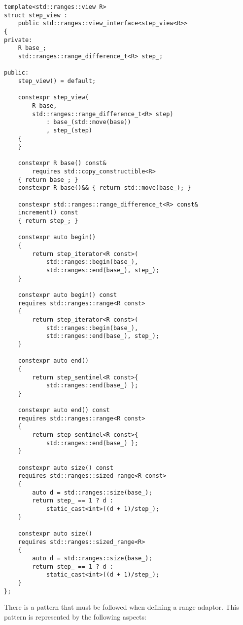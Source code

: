 \begin{lstlisting}[style=styleCXX]
template<std::ranges::view R>
struct step_view :
	public std::ranges::view_interface<step_view<R>>
{
private:
	R base_;
	std::ranges::range_difference_t<R> step_;
	
public:
	step_view() = default;
	
	constexpr step_view(
		R base,
		std::ranges::range_difference_t<R> step)
			: base_(std::move(base))
			, step_(step)
	{
	}

	constexpr R base() const&
		requires std::copy_constructible<R>
	{ return base_; }
	constexpr R base()&& { return std::move(base_); }
	
	constexpr std::ranges::range_difference_t<R> const&
	increment() const
	{ return step_; }
	
	constexpr auto begin()
	{
		return step_iterator<R const>(
			std::ranges::begin(base_),
			std::ranges::end(base_), step_);
	}

	constexpr auto begin() const
	requires std::ranges::range<R const>
	{
		return step_iterator<R const>(
			std::ranges::begin(base_),
			std::ranges::end(base_), step_);
	}

	constexpr auto end()
	{
		return step_sentinel<R const>{
			std::ranges::end(base_) };
	}

	constexpr auto end() const
	requires std::ranges::range<R const>
	{
		return step_sentinel<R const>{
			std::ranges::end(base_) };
	}

	constexpr auto size() const
	requires std::ranges::sized_range<R const>
	{
		auto d = std::ranges::size(base_);
		return step_ == 1 ? d :
			static_cast<int>((d + 1)/step_); 
	}
	
	constexpr auto size()
	requires std::ranges::sized_range<R>
	{
		auto d = std::ranges::size(base_);
		return step_ == 1 ? d :
			static_cast<int>((d + 1)/step_);
	}
};
\end{lstlisting}

There is a pattern that must be followed when defining a range adaptor. This pattern is represented by the following aspects:

